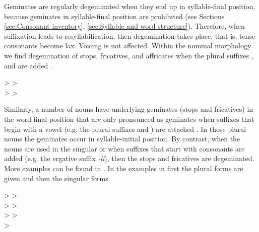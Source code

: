 Geminates are regularly degeminated when they end up in syllable-final position, because geminates in syllable-final position are prohibited (see Sections \ref{sec:Consonant inventory}, \ref{sec:Syllable and word structure}). Therefore, when suffixation leads to resyllabification, then degemination takes place, that is, tense consonants become lax. Voicing is not affected. Within the nominal morphology we find degemination of stops, fricatives, and affricates when the plural suffixes ,  and  are added .
%
\begin{exe}
	\ex	\label{ex:degemination be ne me phon}
\TabPositions{14em} 
		 >  	\tab 	{} >   \\
		 >  		\tab 	{} >  
\end{exe}

Similarly, a number of nouns have underlying geminates (stops and fricatives) in the word-final position that are only pronounced as geminates when suffixes that begin with a vowel (e.g. the plural suffixes  and ) are attached  . In those plural nouns the geminates occur in syllable-initial position. By contrast, when the nouns are used in the singular or when suffixes that start with consonants are added (e.g. the ergative suffix \textit{-li}), then the stops and fricatives are degeminated. More examples can be found in . In the examples in  first the plural forms are given and then the singular forms.
  
%
\begin{exe}
	\ex	\label{ex:gemination e upee phon}
\TabPositions{13em} 
		  >  	\tab 		{} >   \\
		 >  	\tab 		{} >   \\
		 >   	\tab 		{} >   \\
		 >   
\end{exe}



